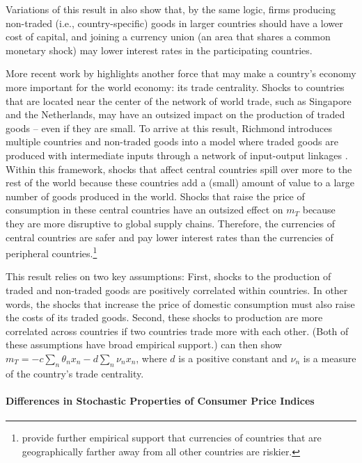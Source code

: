 \documentclass[11pt]{article}
\begin{document}
Variations of this result in \citet{Hassan2013} also show that, by the same logic, firms producing non-traded (i.e., country-specific) goods in larger countries should have a lower cost of capital, and joining a currency union (an area that shares a common monetary shock) may lower interest rates in the participating countries.

More recent work by \citet{Richmond2019} highlights another force that may make a country's economy more important for the world economy: its trade centrality. Shocks to countries that are located near the center of the network of world trade, such as Singapore and the Netherlands, may have an outsized impact on the production of traded goods -- even if they are small. To arrive at this result, Richmond introduces multiple countries and non-traded goods into a model where traded goods are produced with intermediate inputs through a network of input-output linkages \citep{LongPlosser1983, Acemogluetal2012}. Within this framework, shocks that affect central countries spill over more to the rest of the world because these countries add a (small) amount of value to a large number of goods produced in the world. Shocks that raise the price of consumption in these central countries have an outsized effect on  $m_T$ because they are more disruptive to global supply chains. Therefore, the currencies of central countries are safer and pay lower interest rates than the currencies of peripheral countries.\footnote{\citet{LustigRichmond2020} provide further empirical support that currencies of countries that are geographically farther away from all other countries are riskier.}   

This result relies on two key assumptions: First, shocks to the production of traded and non-traded goods are positively correlated within countries. In other words, the shocks that increase the price of domestic consumption must also raise the costs of its traded goods. Second, these shocks to production are more correlated across countries if two countries trade more with each other. (Both of these assumptions have broad empirical support.) \citet{Richmond2019} can then show $m_{T} = -c \sum_{n} \theta_n x_n- d\sum_{n} \nu_n x_n$, where $d$ is a positive constant and $\nu_n$ is a measure of the country's trade centrality.


\paragraph*{Differences in Stochastic Properties of Consumer Price Indices}
\end{document}

